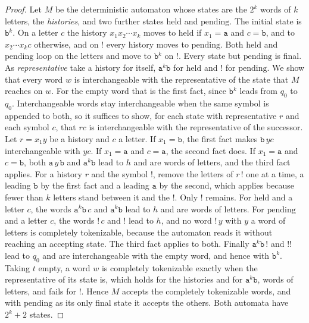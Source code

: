 \documentclass[11pt,a4paper]{article}
\theoremstyle{definition}
\theoremstyle{plain}
\newcommand{\code}[1]{\texttt{#1}}
\begin{document}
\begin{proof}
Let $M$ be the deterministic automaton whose states are the $2^k$ words of $k$ letters, the \emph{histories}, and two
further states $\mathrm{held}$ and $\mathrm{pending}$. The initial state is $\code{b}^k$. On a letter $c$ the history
$x_1 x_2 \cdots x_k$ moves to $\mathrm{held}$ if $x_1 = \code{a}$ and $c = \code{b}$, and to $x_2 \cdots x_k c$
otherwise, and on $\code{!}$ every history moves to $\mathrm{pending}$. Both $\mathrm{held}$ and $\mathrm{pending}$ loop
on the letters and move to $\code{b}^k$ on $\code{!}$. Every state but $\mathrm{pending}$ is final. As
\emph{representative} take a history for itself, $\code{a}^k\code{b}$ for $\mathrm{held}$ and $\code{!}$ for
$\mathrm{pending}$. We show that every word $w$ is interchangeable with the representative of the state that $M$ reaches
on $w$. For the empty word that is the first fact, since $\code{b}^k$ leads from $q_0$ to $q_0$. Interchangeable words
stay interchangeable when the same symbol is appended to both, so it suffices to show, for each state with
representative $r$ and each symbol $c$, that $rc$ is interchangeable with the representative of the successor. Let
$r = x_1 y$ be a history and $c$ a letter. If $x_1 = \code{b}$, the first fact makes $\code{b}\,yc$ interchangeable with
$yc$. If $x_1 = \code{a}$ and $c = \code{a}$, the second fact does. If $x_1 = \code{a}$ and $c = \code{b}$, both
$\code{a}\,y\,\code{b}$ and $\code{a}^k\code{b}$ lead to $h$ and are words of letters, and the third fact applies. For a
history $r$ and the symbol $\code{!}$, remove the letters of $r\,\code{!}$ one at a time, a leading $\code{b}$ by the
first fact and a leading $\code{a}$ by the second, which applies because fewer than $k$ letters stand between it and the
$\code{!}$. Only $\code{!}$ remains. For $\mathrm{held}$ and a letter $c$, the words $\code{a}^k\code{b}\,c$ and
$\code{a}^k\code{b}$ lead to $h$ and are words of letters. For $\mathrm{pending}$ and a letter $c$, the words
$\code{!}\,c$ and $\code{!}$ lead to $h$, and no word $\code{!}\,y$ with $y$ a word of letters is completely
tokenizable, because the automaton reads it without reaching an accepting state. The third fact applies to both. Finally
$\code{a}^k\code{b}\,\code{!}$ and $\code{!!}$ lead to $q_0$ and are interchangeable with the empty word, and hence with
$\code{b}^k$. Taking $t$ empty, a word $w$ is completely tokenizable exactly when the representative of its state is,
which holds for the histories and for $\code{a}^k\code{b}$, words of letters, and fails for $\code{!}$. Hence $M$
accepts the completely tokenizable words, and with $\mathrm{pending}$ as its only final state it accepts the others.
Both automata have $2^k + 2$ states.


\end{proof}
\end{document}
